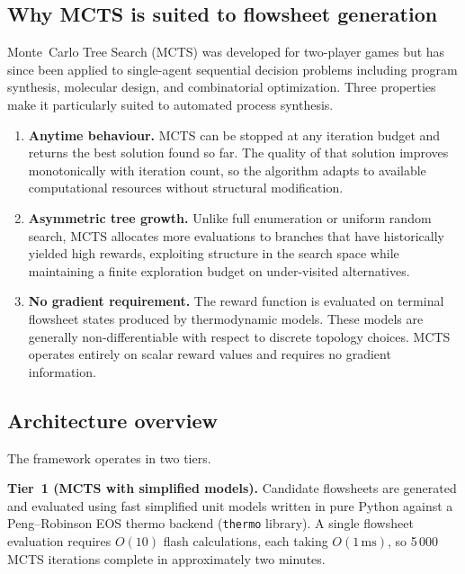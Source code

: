 \documentclass[11pt,a4paper]{article}
\theoremstyle{definition}
\theoremstyle{plain}
\begin{document}
\subsection{Why MCTS is suited to flowsheet generation}

Monte~Carlo Tree Search (MCTS) \citep{coulom2006, kocsis2006} was developed for two-player games but has since been applied to single-agent sequential decision problems including program synthesis, molecular design, and combinatorial optimization. Three properties make it particularly suited to automated process synthesis.

\begin{enumerate}[label=(\roman*)]
 \item \textbf{Anytime behaviour.} MCTS can be stopped at any iteration budget and returns the best solution found so far. The quality of that solution improves monotonically with iteration count, so the algorithm adapts to available computational resources without structural modification.

 \item \textbf{Asymmetric tree growth.} Unlike full enumeration or uniform random search, MCTS allocates more evaluations to branches that have historically yielded high rewards, exploiting structure in the search space while maintaining a finite exploration budget on under-visited alternatives.

 \item \textbf{No gradient requirement.} The reward function is evaluated on terminal flowsheet states produced by thermodynamic models. These models are generally non-differentiable with respect to discrete topology choices. MCTS operates entirely on scalar reward values and requires no gradient information.
\end{enumerate}

\subsection{Architecture overview}

The framework operates in two tiers.

\textbf{Tier~1 (MCTS with simplified models).} Candidate flowsheets are generated and evaluated using fast simplified unit models written in pure Python against a Peng--Robinson EOS thermo backend (\texttt{thermo} library). A single flowsheet evaluation requires $O(10)$ flash calculations, each taking $O(1\,\mathrm{ms})$, so 5\,000 MCTS iterations complete in approximately two minutes.
\end{document}
